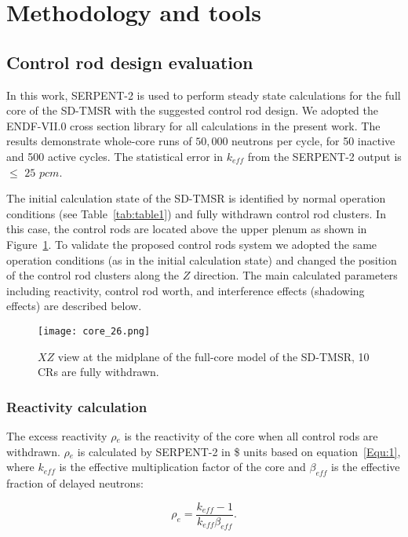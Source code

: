 \section{Methodology and tools} \label{Methodology-and-tools}
\subsection{Control rod design evaluation}
In this work, SERPENT-2 \cite{leppanen2014serpent} is used to 
perform steady state calculations for the full core of the SD-TMSR with 
the suggested control rod design. We adopted the ENDF-VII.0 cross section library 
for all calculations in the present work. The results demonstrate whole-core 
runs of $50,000$ neutrons per cycle, for 50 inactive and 500 active cycles. The 
statistical error in $k_{eff}$ from the SERPENT-2 output is $\leq$ $25$ 
$pcm$.

The initial calculation state of the SD-TMSR is identified by normal operation 
conditions (see Table~\ref{tab:table1}) and fully withdrawn control rod 
clusters. In this case, the control rods are located above the upper plenum as 
shown in Figure~\ref{fig:core_26}. To validate the proposed control rods 
system we adopted the same operation conditions (as in the initial calculation 
state) and changed the position of the control rod clusters along the $Z$ 
direction. The main calculated parameters including reactivity, control rod 
worth, and interference effects (shadowing effects) are described below.

\begin{figure}[t!] %
	\centering
	\texttt{[image: core\_26.png]}
	\caption{$XZ$ view at the midplane of the full-core model of the SD-TMSR, 10 CRs are fully withdrawn.}
	\label{fig:core_26}
\end{figure}

\subsubsection{Reactivity calculation}

The excess reactivity $\rho$$_e$ is the reactivity of the core when all control rods are withdrawn. $\rho$$_e$ is calculated by SERPENT-2 in \$ units based on equation~\ref{Equ:1}, where $k_{eff}$ is the effective multiplication factor of the core and $\beta_{eff}$ is the effective fraction of delayed neutrons:

\begin{equation}
\label{Equ:1}
{{\rho}_{e}}=\dfrac{{k_{eff}}-1}{{k_{eff}}{{\beta}_{eff}}}.
\end{equation}

